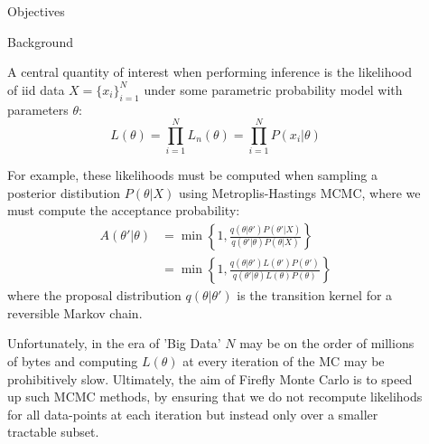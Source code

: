 \documentclass[final]{beamer}
\newlength{\sepwid}
\newlength{\onecolwid}
\newlength{\twocolwid}
\begin{document}
\begin{frame}[t]
\begin{columns}[t]
\begin{column}{\onecolwid}
\begin{alertblock}{Objectives}
\end{alertblock}


\begin{block}{Background}

A central quantity of interest when performing inference is the likelihood of
iid data $X = \{x_i\}_{i=1}^N$ under some parametric probability model with
parameters $\theta$:
\begin{equation}
  \label{eq:lik}
  L(\theta) = \prod_{i=1}^N L_n(\theta) = \prod_{i=1}^N P(x_i | \theta)
\end{equation}

For example, these likelihoods must be computed  when sampling a posterior
distibution $P(\theta | X)$ using  Metroplis-Hastings MCMC, where
we must compute the acceptance probability:
\begin{align}
  A(\theta'| \theta)
  &= \min \left\{
      1,
      \frac{q(\theta | \theta') P(\theta'|X)}{q(\theta' | \theta) P(\theta | X)}
    \right\}\\
  &= \min \left\{
      1,
      \frac{q(\theta|\theta') L(\theta')P(\theta')}{q(\theta'|\theta) L(\theta)P(\theta)}
    \right\}
\end{align}
where the proposal distribution $q(\theta|\theta')$ is the transition
kernel for a reversible Markov chain.

Unfortunately, in the era of 'Big Data' $N$ may be on the order of millions of
bytes and computing $L(\theta)$ at every iteration of the MC may be
prohibitively slow. Ultimately, the aim of Firefly Monte Carlo is to speed up
such MCMC methods, by ensuring that we do not recompute likelihods for all
data-points at each iteration but instead only over a smaller tractable
subset. 

\end{block}


\end{column} %

\begin{column}{\sepwid}\end{column} %

\begin{column}{\twocolwid} %


\end{column}
\end{columns}
\end{frame}
\end{document}
